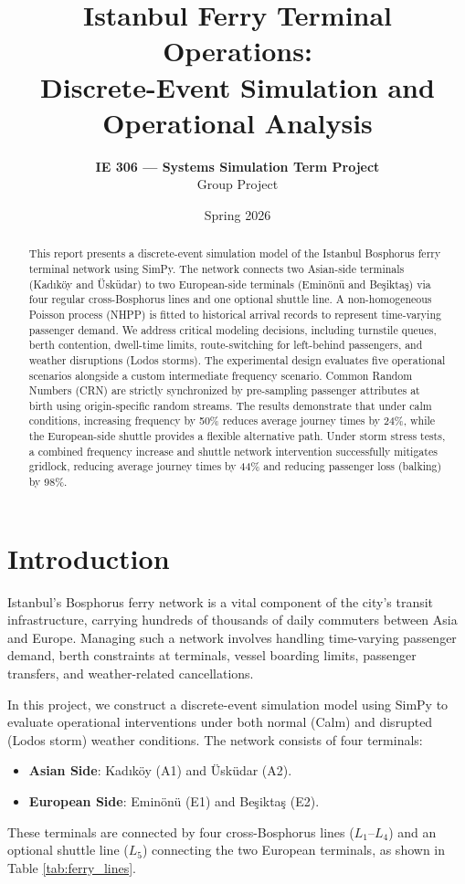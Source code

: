 \documentclass[11pt,a4paper]{article}
\title{\textbf{Istanbul Ferry Terminal Operations: \\ Discrete-Event Simulation and Operational Analysis}}
\author{\textbf{IE 306 --- Systems Simulation Term Project} \\ Group Project}
\date{Spring 2026}
\begin{document}
\maketitle

\begin{abstract}
This report presents a discrete-event simulation model of the Istanbul Bosphorus ferry terminal network using SimPy. The network connects two Asian-side terminals (Kad\i k\"{o}y and \"Usk\"{u}dar) to two European-side terminals (Emin\"{o}n\"{u} and Be\c{s}ikta\c{s}) via four regular cross-Bosphorus lines and one optional shuttle line. A non-homogeneous Poisson process (NHPP) is fitted to historical arrival records to represent time-varying passenger demand. We address critical modeling decisions, including turnstile queues, berth contention, dwell-time limits, route-switching for left-behind passengers, and weather disruptions (Lodos storms). The experimental design evaluates five operational scenarios alongside a custom intermediate frequency scenario. Common Random Numbers (CRN) are strictly synchronized by pre-sampling passenger attributes at birth using origin-specific random streams. The results demonstrate that under calm conditions, increasing frequency by 50\% reduces average journey times by 24\%, while the European-side shuttle provides a flexible alternative path. Under storm stress tests, a combined frequency increase and shuttle network intervention successfully mitigates gridlock, reducing average journey times by 44\% and reducing passenger loss (balking) by 98\%.
\end{abstract}

\section{Introduction}
Istanbul’s Bosphorus ferry network is a vital component of the city's transit infrastructure, carrying hundreds of thousands of daily commuters between Asia and Europe. Managing such a network involves handling time-varying passenger demand, berth constraints at terminals, vessel boarding limits, passenger transfers, and weather-related cancellations. 

In this project, we construct a discrete-event simulation model using SimPy to evaluate operational interventions under both normal (Calm) and disrupted (Lodos storm) weather conditions. The network consists of four terminals:
\begin{itemize}
    \item \textbf{Asian Side}: Kad\i k\"{o}y (A1) and \"Usk\"{u}dar (A2).
    \item \textbf{European Side}: Emin\"{o}n\"{u} (E1) and Be\c{s}ikta\c{s} (E2).
\end{itemize}
These terminals are connected by four cross-Bosphorus lines ($L_1$--$L_4$) and an optional shuttle line ($L_5$) connecting the two European terminals, as shown in Table \ref{tab:ferry_lines}.
\end{document}
